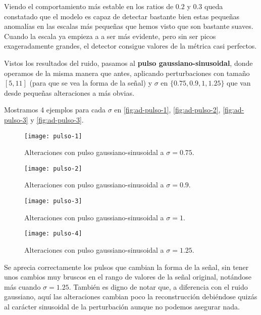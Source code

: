 Viendo el comportamiento más estable en los ratios de $0.2$ y $0.3$ queda constatado que el modelo es capaz de detectar bastante bien estas pequeñas anomalías en las escalas más pequeñas que hemos visto que son bastante suaves. Cuando la escala ya empieza a a ser más evidente, pero sin ser picos exageradamente grandes, el detector consigue valores de la métrica casi perfectos.

Vistos los resultados del ruido, pasamos al \textbf{pulso gaussiano-sinusoidal}, donde operamos de la misma manera que antes, aplicando perturbaciones con tamaño $[5, 11]$ (para que se vea la forma de la señal) y $\sigma$ en $\{0.75, 0.9, 1, 1.25\}$ que van desde pequeñas alteraciones a más obvias.

Mostramos 4 ejemplos para cada $\sigma$ en \autoref{fig:ad-pulso-1}, \autoref{fig:ad-pulso-2}, \autoref{fig:ad-pulso-3} y \autoref{fig:ad-pulso-3}.

\begin{figure}[htpb]
  \centering
  \texttt{[image: pulso-1]}
  \caption{Alteraciones con pulso gaussiano-sinusoidal a $\sigma = 0.75$.}
  \label{fig:ad-pulso-1}
\end{figure}

\begin{figure}[htpb]
  \centering
  \texttt{[image: pulso-2]}
  \caption{Alteraciones con pulso gaussiano-sinusoidal a $\sigma = 0.9$.}
  \label{fig:ad-pulso-2}
\end{figure}

\begin{figure}[htpb]
  \centering
  \texttt{[image: pulso-3]}
  \caption{Alteraciones con pulso gaussiano-sinusoidal a $\sigma = 1$.}
  \label{fig:ad-pulso-3}
\end{figure}

\begin{figure}[htpb]
  \centering
  \texttt{[image: pulso-4]}
  \caption{Alteraciones con pulso gaussiano-sinusoidal a $\sigma = 1.25$.}
  \label{fig:ad-pulso-4}
\end{figure}

Se aprecia correctamente los pulsos que cambian la forma de la señal, sin tener unos cambios muy bruscos en el rango de valores de la señal original, notándose más cuando $\sigma = 1.25$. También es digno de notar que, a diferencia con el ruido gaussiano, aquí las alteraciones cambian poco la reconstrucción debiéndose quizás al carácter sinusoidal de la perturbación aunque no podemos asegurar nada.

